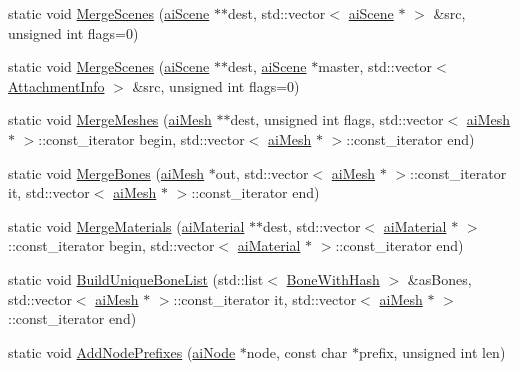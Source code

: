 \begin{DoxyCompactItemize}
\item 
static void \hyperlink{class_assimp_1_1_scene_combiner_ad6cdfab1f2b7fba74536f66ead9c5c2b}{Merge\+Scenes} (\hyperlink{structai_scene}{ai\+Scene} $\ast$$\ast$dest, std\+::vector$<$ \hyperlink{structai_scene}{ai\+Scene} $\ast$ $>$ \&src, unsigned int flags=0)
\item 
static void \hyperlink{class_assimp_1_1_scene_combiner_aa829482d9eecd375cd28cb54b07b98e6}{Merge\+Scenes} (\hyperlink{structai_scene}{ai\+Scene} $\ast$$\ast$dest, \hyperlink{structai_scene}{ai\+Scene} $\ast$master, std\+::vector$<$ \hyperlink{struct_assimp_1_1_attachment_info}{Attachment\+Info} $>$ \&src, unsigned int flags=0)
\item 
static void \hyperlink{class_assimp_1_1_scene_combiner_a6e29b5f873a22a556cb823de3c118d41}{Merge\+Meshes} (\hyperlink{structai_mesh}{ai\+Mesh} $\ast$$\ast$dest, unsigned int flags, std\+::vector$<$ \hyperlink{structai_mesh}{ai\+Mesh} $\ast$ $>$\+::const\+\_\+iterator begin, std\+::vector$<$ \hyperlink{structai_mesh}{ai\+Mesh} $\ast$ $>$\+::const\+\_\+iterator end)
\item 
static void \hyperlink{class_assimp_1_1_scene_combiner_a4edb3acefc33160d667f47c045ef6ba8}{Merge\+Bones} (\hyperlink{structai_mesh}{ai\+Mesh} $\ast$out, std\+::vector$<$ \hyperlink{structai_mesh}{ai\+Mesh} $\ast$ $>$\+::const\+\_\+iterator it, std\+::vector$<$ \hyperlink{structai_mesh}{ai\+Mesh} $\ast$ $>$\+::const\+\_\+iterator end)
\item 
static void \hyperlink{class_assimp_1_1_scene_combiner_ab01dbc7f9794d3cd923eb2b3a398d925}{Merge\+Materials} (\hyperlink{classai_material}{ai\+Material} $\ast$$\ast$dest, std\+::vector$<$ \hyperlink{classai_material}{ai\+Material} $\ast$ $>$\+::const\+\_\+iterator begin, std\+::vector$<$ \hyperlink{classai_material}{ai\+Material} $\ast$ $>$\+::const\+\_\+iterator end)
\item 
static void \hyperlink{class_assimp_1_1_scene_combiner_a4840646d4e46a1e4c0c56742754dbea3}{Build\+Unique\+Bone\+List} (std\+::list$<$ \hyperlink{struct_assimp_1_1_bone_with_hash}{Bone\+With\+Hash} $>$ \&as\+Bones, std\+::vector$<$ \hyperlink{structai_mesh}{ai\+Mesh} $\ast$ $>$\+::const\+\_\+iterator it, std\+::vector$<$ \hyperlink{structai_mesh}{ai\+Mesh} $\ast$ $>$\+::const\+\_\+iterator end)
\item 
static void \hyperlink{class_assimp_1_1_scene_combiner_a0d9ab7d29675eced1a8b5918d908d740}{Add\+Node\+Prefixes} (\hyperlink{structai_node}{ai\+Node} $\ast$node, const char $\ast$prefix, unsigned int len)

\end{DoxyCompactItemize}
